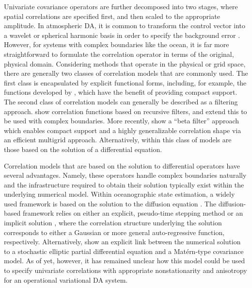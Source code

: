 Univariate covariance operators are further decomposed into two stages, where spatial
correlations are specified first, and then scaled to the appropriate amplitude.
In atmospheric DA, it is common to transform the control vector
into a wavelet or spherical harmonic basis in order to specify the background
error \citep[e.g.][]{bannister_review_2008-2}.
However, for systems with complex boundaries like the ocean, it is far more
straightforward to formulate the correlation operator in terms of the original,
physical domain.
Considering methods that operate in the physical or grid space, there are
generally two classes of correlation models that are commonly used.
The first class is encapsulated by explicit functional forms, including, for
example, the functions developed by
\citet{gaspari_construction_1999,gneiting_correlation_1999,gaspari_construction_2006},
which have the benefit of providing compact support.
The second class of correlation models can generally be described as a filtering
approach.
\citet{purser_numerical_2003-1,purser_numerical_2003-2}
show correlation functions based on recursive filters, and
\citet{dobricic_oceanographic_2008} extend this to be used with complex boundaries.
More recently, \citet{purser_multigrid_2022} show a ``beta
filter'' approach which enables compact support and a highly generalizable
correlation shape via an efficient multigrid approach.
Alternatively, within this class of models are those based on the solution of a
differential equation.

Correlation models that are based on the solution to differential operators have
several advantages.
Namely, these operators handle complex boundaries naturally and the
infrastructure required to obtain their solution typically exist within
the underlying numerical model.
Within oceanographic state estimation, a widely used framework is based on the
solution to the diffusion equation
\citep[e.g.][]{nguyen_arctic_2021,forgetECCOv4,blockley_recent_2014,moore_regional_2011-1,daget_ensemble_2009,muccino_inverse_2008,di_lorenzo_weak_2007,weaver_three-_2003}.
The diffusion-based framework relies on either an explicit, pseudo-time stepping
method \citep{weaver_correlation_2001} or an implicit solution
\citep{mirouze_representation_2010,carrier_background-error_2010,weaver_diffusion_2013},
where the correlation structure underlying the solution corresponds to either a
Gaussian or more general auto-regressive function, respectively.
Alternatively, \citet{RSSB:RSSB777} show an explicit link between the numerical solution
to a stochastic elliptic partial differential equation and a Mat\'ern-type covariance
model.
As of yet, however, it has remained unclear how this model could be used to
specify univariate correlations with appropriate nonstationarity and anisotropy
for an operational variational DA system.

